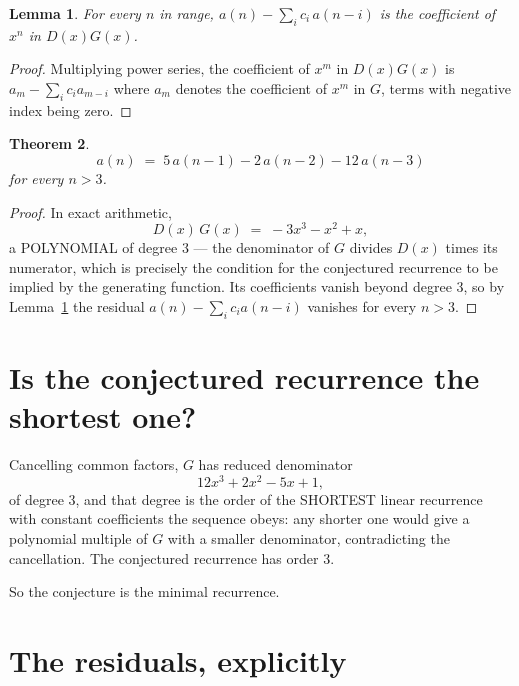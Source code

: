 \documentclass[11pt,a4paper]{article}
\theoremstyle{plain}
\newtheorem{theorem}{Theorem}
\newtheorem{lemma}[theorem]{Lemma}
\theoremstyle{definition}
\begin{document}
\begin{lemma}\label{lem:key}
For every $n$ in range, $a(n)-\sum_i c_i\,a(n-i)$ is the coefficient of $x^{n}$ in
$D(x)G(x)$.
\end{lemma}

\begin{proof}
Multiplying power series, the coefficient of $x^{m}$ in $D(x)G(x)$ is
$a_m-\sum_i c_i a_{m-i}$ where $a_m$ denotes the coefficient of $x^{m}$ in $G$, terms with
negative index being zero.
\end{proof}

\begin{theorem}
\[
a(n)\;=\;5\,a(n-1) - 2\,a(n-2) - 12\,a(n-3)
\]
for every $n>3$.
\end{theorem}

\begin{proof}
In exact arithmetic,
\[
D(x)\,G(x)\;=\;- 3 x^{3} - x^{2} + x,
\]
a POLYNOMIAL of degree $3$ --- the denominator of $G$ divides $D(x)$ times its numerator,
which is precisely the condition for the conjectured recurrence to be implied by the
generating function. Its coefficients vanish beyond degree $3$, so by
Lemma~\ref{lem:key} the residual $a(n)-\sum_ic_ia(n-i)$ vanishes for every
$n>3$.
\end{proof}

\section{Is the conjectured recurrence the shortest one?}

Cancelling common factors, $G$ has reduced denominator
\[
12 x^{3} + 2 x^{2} - 5 x + 1,
\]
of degree $3$, and that degree is the order of the SHORTEST linear recurrence with
constant coefficients the sequence obeys: any shorter one would give a polynomial multiple of
$G$ with a smaller denominator, contradicting the cancellation. The conjectured recurrence has
order $3$.

So the conjecture is the minimal recurrence.

\section{The residuals, explicitly}
\end{document}
